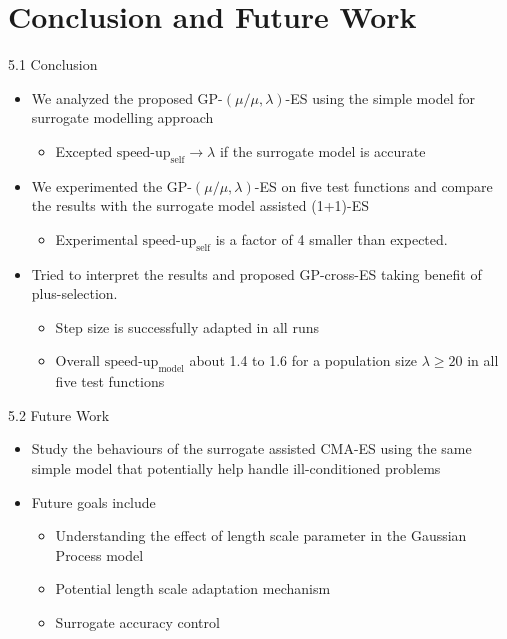 \documentclass{beamer}
\begin{document}
\section{Conclusion and Future Work}
\begin{frame}{5.1 Conclusion}
  \begin{itemize}
  \item
    We analyzed the proposed GP-$(\mu/\mu,\lambda)$-ES using the simple model for surrogate modelling approach
    \begin{itemize}
        \item Excepted $\text{speed-up}_{\text{self}}\rightarrow \lambda$ if the surrogate model is accurate
    \end{itemize}
  \item
    We experimented the GP-$(\mu/\mu,\lambda)$-ES on five test functions and compare the results with the surrogate model assisted (1+1)-ES
    \begin{itemize}
        \item Experimental $\text{speed-up}_{\text{self}}$ is a factor of 4 smaller than expected. 
    \end{itemize}
  \item
    Tried to interpret the results and proposed GP-cross-ES taking benefit of plus-selection.
    \begin{itemize}
        \item Step size is successfully adapted in all runs
        \item Overall $\text{speed-up}_{\text{model}}$ about 1.4 to 1.6 for a population size $\lambda \geq 20$ in all five test functions
    \end{itemize}
  \end{itemize}
  
\end{frame}

\begin{frame}{5.2 Future Work}
  \begin{itemize}
  \item
    Study the behaviours of the surrogate assisted CMA-ES using the same simple model that potentially help handle ill-conditioned problems
  \item
    Future goals include
    \begin{itemize}
        \item Understanding the effect of length scale parameter in the Gaussian Process model 
        \item Potential length scale adaptation mechanism
        \item Surrogate accuracy control
    \end{itemize}

  \end{itemize}
  
\end{frame}
\end{document}
